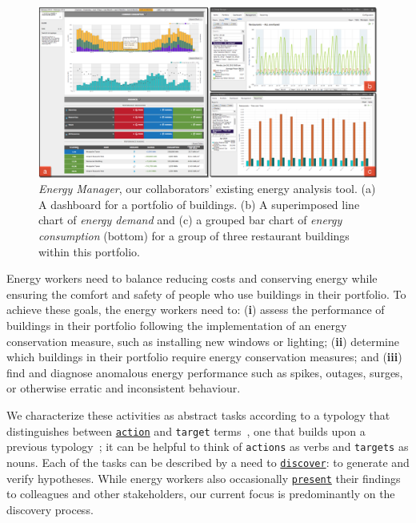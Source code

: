 \documentclass[journal]{vgtc}                %
\newcommand{\jn}[1]{\textcolor{darkGreen}{#1}}
\begin{document}
\begin{figure}[hbp!]
    \vspace{-0.45cm}
	\centering
	\includegraphics[width=\textwidth]{figures/em.pdf}
	\vspace{-0.6cm}
	\caption{\textsl{Energy Manager}, our collaborators' existing energy analysis tool. (a) A dashboard for a portfolio of buildings. (b) A superimposed line chart of \textsl{energy demand} and (c) a grouped bar chart of \textsl{energy consumption} (bottom) for a group of three restaurant buildings within this portfolio.}
	\label{fig:energy-manager}
\end{figure} 

Energy workers need to balance reducing costs and conserving energy while ensuring the comfort and safety of people who use buildings in their portfolio. %
To achieve these goals, the energy workers need to: ({\bf i}) assess the performance of buildings in their portfolio following the implementation of an energy conservation measure, such as installing new windows or lighting; ({\bf ii}) determine which buildings in their portfolio require energy conservation measures; and ({\bf iii}) find and diagnose anomalous energy performance such as spikes, outages, surges, or otherwise erratic and inconsistent behaviour.

We characterize these activities as abstract tasks according to a typology that distinguishes between \underline{{\tt action}} and {\tt target} terms~\cite{Munzner2014}, one that builds upon a previous typology~\cite{Brehmer2013}; it can be helpful to think of {\tt actions} as verbs and {\tt targets} as nouns.
Each of the tasks can be described by a need to \underline{{\tt discover}}: to generate and verify hypotheses.
While energy workers also occasionally \underline{{\tt present}} their findings to colleagues and other stakeholders, our current focus is predominantly on the discovery process. 
\end{document}
